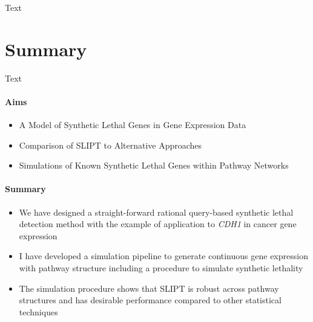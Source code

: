 Text


\section{Summary}

Text


\clearpage

\paragraph{Aims}

  \begin{itemize}
   \item A Model of Synthetic Lethal Genes in Gene Expression Data
   
   \bigskip
   
   \item Comparison of SLIPT to Alternative Approaches
   
   \bigskip
   
   \item Simulations of Known Synthetic Lethal Genes within Pathway Networks
      
  \end{itemize}

\paragraph{Summary}

    \begin{itemize}
      \item We have designed a straight-forward rational query-based synthetic lethal detection method with the example of application to \textit{CDH1} in cancer gene expression
      
      \bigskip
      
      \item I have developed a simulation pipeline to generate continuous gene expression with pathway structure including a procedure to simulate synthetic lethality 
      
      \bigskip
      
      \item The simulation procedure shows that SLIPT is robust across pathway structures and has desirable performance compared to other statistical techniques 
      \end{itemize}